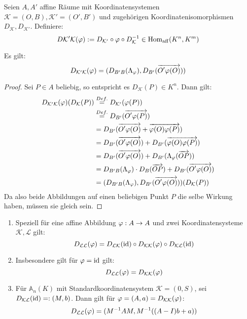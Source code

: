 \documentclass[parskip,a4paper,twoside,DIV15,BCOR12mm]{scrbook}
\begin{document}
\begin{definition}
Seien $A,A'$ affine Räume mit Koordinatensystemen $\mathcal{K}=(O,B),\mathcal{K'}=(O',B')$
und zugehörigen Koordinatenisomorphismen $D_{\mathcal{K}},D_{\mathcal{K'}}$. Definiere:
\[D{\mathcal{K'K}}(\varphi):=D_{\mathcal{K'}}\circ \varphi\circ D_{\mathcal{K}}^{-1}\in\operatorname{Hom_{aff}}(K^n,K^m)\]
\end{definition}

\begin{lemma}
Es gilt:
\[D_{\mathcal{K'K}}(\varphi)=(D_{B'B}(\Lambda_\varphi),D_{B'}(\overrightarrow{O'\varphi(O)}))\]
\end{lemma}

\begin{proof}
Sei $P\in A$ beliebig, so entspricht es $D_\mathcal{K}(P)\in K^n$. Dann gilt:
\begin{align*}
D_{\mathcal{K'K}}(\varphi)(D_\mathcal{K}(P)) &\stackrel{Def.}{=} D_\mathcal{K'}(\varphi(P))\\
&\stackrel{Def.}{=} D_{B'}(\overrightarrow{O'\varphi(P)})\\
&= D_{B'}(\overrightarrow{O'\varphi(O)}+\overrightarrow{\varphi(O)\varphi(P)})\\
&= D_{B'}(\overrightarrow{O'\varphi(O)})+D_{B'}(\overrightarrow{\varphi(O)\varphi(P)})\\
&= D_{B'}(\overrightarrow{O'\varphi(O)})+D_{B'}(\Lambda_\varphi (\overrightarrow{OP}))\\
&= D_{B'B}(\Lambda_\varphi)\cdot D_B(\overrightarrow{OP})+D_{B'}(\overrightarrow{O'\varphi(O)})\\
&= (D_{B'B}(\Lambda_\varphi),D_{B'}(\overrightarrow{O'\varphi(O)}))(D_\mathcal{K}(P))
\end{align*}
Da also beide Abbildungen auf einen beliebigen Punkt $P$ die selbe Wirkung haben, 
müssen sie gleich sein.
\end{proof}

\begin{comment}
Das Zusammenfügen von kommutativen Diagrammen liefert für einen weiteren affinen Raum
$A''$ mit Koordinatensystem $\mathcal{K''}=(O'',B'')$ und einer affinen Abbildung $\Psi:
A'\to A''$:
\[D_{\mathcal{K''K}}(\psi\circ\vp)=D_{\mathcal{K''K'}}(\psi)\circ D_{\mathcal{K'K}}(\vp)\]
\end{comment}

\begin{corollary}
\begin{enumerate}
\item Speziell für eine affine Abbildung $\varphi:A\to A$ und zwei Koordinatensysteme
$\mathcal{K,L}$ gilt:
\[D_{\mathcal{LL}}(\varphi)=D_{\mathcal{LK}}(\operatorname{id})\circ D_{\mathcal{KK}}(\varphi)\circ D_{\mathcal{KL}}(\operatorname{id})\]
\item Insbesondere gilt für $\varphi=\operatorname{id}$ gilt:
\[D_{\mathcal{LL}}(\varphi)=D_{\mathcal{KK}}(\varphi)\]
\item Für $\mathbb{A}_n(K)$ mit Standardkoordinatensystem $\mathcal{K}=(0,S)$, sei
$D_{\mathcal{KL}}(\operatorname{id})=:(M,b)$. Dann gilt für $\varphi=(A,a)=D_{\mathcal{KK}}(\varphi)$:
\[D_{\mathcal{LL}}(\varphi)=(M^{-1}AM,M^{-1}((A-I)b+a))\]
\end{enumerate}
\end{corollary}
\end{document}
